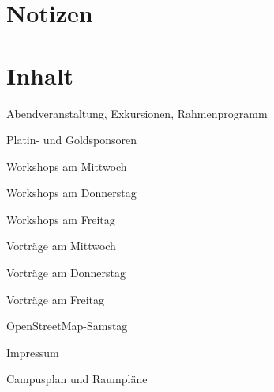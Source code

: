 \section*{Notizen}

\newpage
{}
\section*{Inhalt}
\label{contents}
\newlength\contentspace
\setlength\contentspace{0.2em}

\vspace*{\contentspace}%
\noindent Abendveranstaltung, Exkursionen, Rahmenprogramm  \dotfill \pageref{schwaetzli}

\vspace*{\contentspace}%
\noindent Platin- und Goldsponsoren \dotfill \pageref{platinsposoren}

\vspace*{\contentspace}%
\noindent Workshops am Mittwoch \dotfill \pageref{mittwoch-workshops}

\vspace*{\contentspace}%
\noindent Workshops am Donnerstag \dotfill \pageref{donnerstag-workshops}

\vspace*{\contentspace}%
\noindent Workshops am Freitag \dotfill \pageref{freitag-workshops}

\vspace*{\contentspace}%
\noindent Vorträge am Mittwoch \dotfill \pageref{mittwoch}

\vspace*{\contentspace}%
\noindent Vorträge am Donnerstag \dotfill \pageref{donnerstag}

\vspace*{\contentspace}%
\noindent Vorträge am Freitag \dotfill \pageref{freitag}

\vspace*{\contentspace}%
\noindent OpenStreetMap-Samstag \dotfill \pageref{samstag}

\vspace*{\contentspace}%
\noindent Impressum \dotfill \pageref{impressum}

\vspace*{\contentspace}%
\noindent Campusplan und Raumpläne \dotfill \pageref{kartenseiten}

\justifying

\newpage
